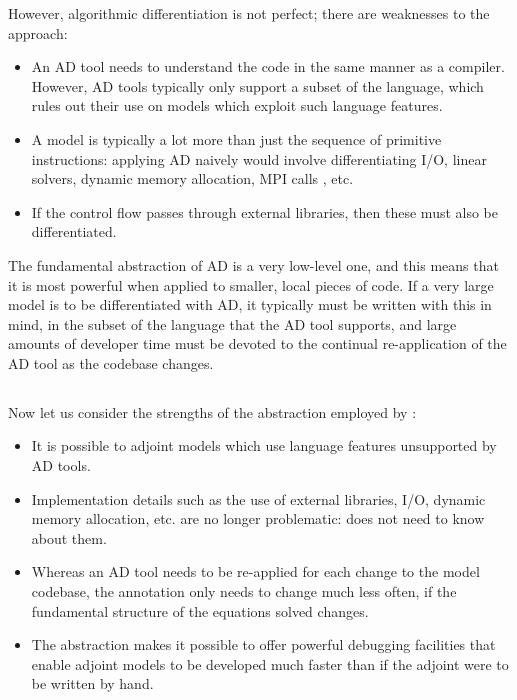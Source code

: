 However, algorithmic differentiation is not perfect; there are weaknesses to
the approach:
\begin{itemize}
\item An AD tool needs to understand the code in the same manner as a compiler.
However, AD tools typically only support a subset of the language, which rules
out their use on models which exploit such language features.
\item A model is typically a lot more than just the sequence of primitive instructions:
applying AD naively would involve differentiating I/O, linear solvers, dynamic
memory allocation, MPI calls \citep{utke2009}, etc.
\item If the control flow passes through external libraries, then these must also be
differentiated.
\end{itemize}

The fundamental abstraction of AD is a very low-level one, and this means that it is
most powerful when applied to smaller, local pieces of code. If a very large
model is to be differentiated with AD, it typically must be written with this in
mind, in the subset of the language that the AD tool supports, and large amounts
of developer time must be devoted to the continual re-application of the AD tool
as the codebase changes.

\subsection{\libadjoint}

Now let us consider the strengths of the abstraction employed by \libadjoint:
\begin{itemize}
\item It is possible to adjoint models which use language features unsupported 
by AD tools.
\item Implementation details such as the use of external libraries, I/O, dynamic
memory allocation, etc. are no longer problematic: \libadjoint does not need to
know about them.
\item Whereas an AD tool needs to be re-applied for each change to the model
codebase, the \libadjoint annotation only needs to change much less often,
if the fundamental structure of the equations solved changes.
\item The abstraction makes it possible to offer powerful debugging facilities that enable adjoint models
to be developed much faster than if the adjoint were to be written by hand. %
\end{itemize}

